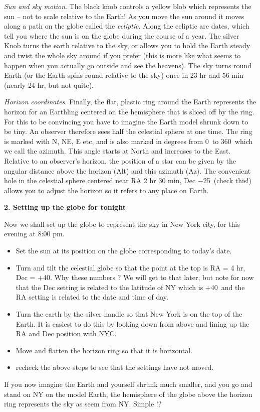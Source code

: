 \medskip\noindent
\emph{Sun and sky motion}.  The black knob controls a yellow blob
which represents the sun -- not to scale relative to the Earth! As you
move the sun around it moves along a path on the globe called the
\emph{ecliptic}. Along the ecliptic are dates, which tell you where
the sun is on the globe during the course of a year. The silver Knob
turns the earth relative to the sky, or allows you to hold the Earth
steady and twist the whole sky around if you prefer (this is more like
what seems to happen when you actually go outside and see the
heavens). The sky turns round Earth (or the Earth spins round relative
to the sky) once in 23 hr and 56 min (nearly 24 hr, but not quite).

\medskip\noindent
\emph{Horizon coordinates}.
Finally, the flat, plastic ring around the Earth represents the horizon for
an Earthling centered on the hemisphere that is sliced off by the
ring. For this to be convincing you have to imagine the Earth model
shrunk down to be tiny. An observer therefore sees half the celestial
sphere at one time. The ring is marked with N, NE, E etc, and is also
marked in degrees from 0\deg\ to 360\deg\ which we call the
azimuth. This angle starts at North and increases to the
East. Relative to an observer's horizon, the position of a star can be
given by the angular distance above the horizon (Alt) and this azimuth
(Az). The convenient hole in the celestial sphere centered near RA 2
hr 30 min, Dec $-$25\deg\ (check this!) allows you to adjust the
horizon so it refers to any place on Earth.

\bigskip
\noindent
{\bf 2. Setting up the globe for tonight}

\medskip
\noindent
Now we shall set up the globe to represent the sky in New York city, for this
evening at 8:00 pm.
\begin{itemize}
\item Set the sun at its position on the globe corresponding to
today's date.
\item Turn and tilt the celestial globe so that the point at the top
is RA = 4 hr, Dec = +40\deg. Why these numbers ? We will get to that
later, but note for now that the Dec setting is related to the
latitude of NY which is +40\deg\, and the RA setting is related to the
date and time of day.
\item Turn the earth by the silver handle so that New York is on the
top of the Earth. It is easiest to do this by looking down from above
and lining up the RA and Dec position with NYC.
\item Move and flatten the horizon ring so that it is horizontal.
\item recheck the above steps to see that the settings have not moved.
\end{itemize}
If you now imagine the Earth and yourself shrunk much smaller, and
you go and stand on NY on the model Earth, the hemisphere of the globe above
the horizon ring represents the sky as seem from NY. Simple !?


